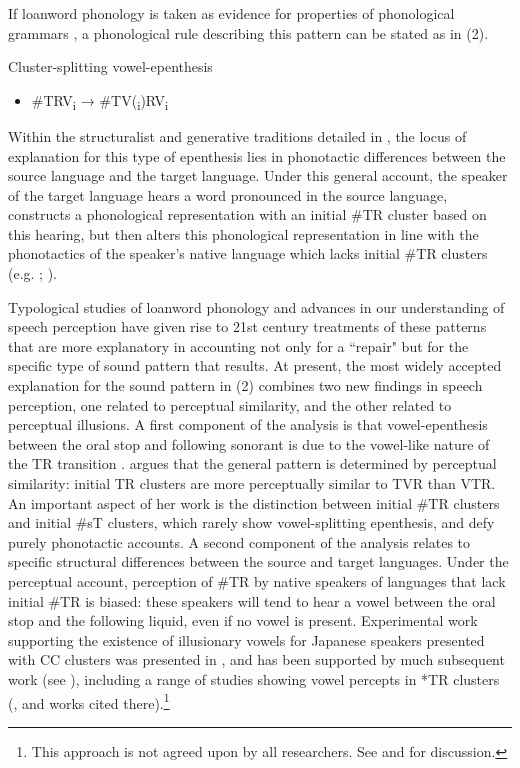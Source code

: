 \documentclass[output=paper,
modfonts
]{LSP/langsci}
\begin{document}
If loanword phonology is taken as evidence for properties of
phonological grammars \citep{hyman1970a}, a phonological rule describing this
pattern can be stated as in (2).

\ea Cluster-splitting vowel-epenthesis
	\begin{itemize}
	\item[] \#TRV\textsubscript{i} → \#TV(\textsubscript{i})RV\textsubscript{i}
	\end{itemize}
\z

Within the structuralist and generative traditions detailed in \citet{anderson1985a}, the locus of explanation for this type of epenthesis lies in
phonotactic differences between the source language and the target
language. Under this general account, the speaker of the target language
hears a word pronounced in the source language, constructs a
phonological representation with an initial \#TR cluster based on this
hearing, but then alters this phonological representation in line with
the phonotactics of the speaker's native language which lacks initial
\#TR clusters (e.g. \citealt{broselow1987a}; \citealt{ito1989a}).

Typological studies of loanword phonology and advances in our
understanding of speech perception have given rise to 21st century
treatments of these patterns that are more explanatory in accounting not
only for a ``repair" but for the specific type of sound pattern that
results. At present, the most widely accepted explanation for the sound
pattern in (2) combines two new findings in speech perception, one
related to perceptual similarity, and the other related to perceptual
illusions. A first component of the analysis is that vowel-epenthesis
between the oral stop and following sonorant is due to the vowel-like
nature of the TR transition \citep{fleischhacker2001a, fleischhacker2005a,Kang2011, berent2013a, broselow2015a}. \citet{fleischhacker2001a, fleischhacker2005a} argues that the general
pattern is determined by perceptual similarity: initial TR clusters are
more perceptually similar to TVR than VTR. An important aspect of her
work is the distinction between initial \#TR clusters and initial \#sT
clusters, which rarely show vowel-splitting epenthesis, and defy purely
phonotactic accounts. A second component of the analysis relates to
specific structural differences between the source and target languages.
Under the perceptual account, perception of \#TR by native speakers of
languages that lack initial \#TR is biased: these speakers will tend to
hear a vowel between the oral stop and the following liquid, even if no
vowel is present. Experimental work supporting the existence of
illusionary vowels for Japanese speakers presented with CC clusters was
presented in \citet{dupoux1999a}, and has been supported by much
subsequent work (see \citealt{peperkamp2002a,kang2003a,Kang2011,kabak2007a,davidson2012a}), including a range of studies
showing vowel percepts in *TR clusters (\citealt{berent2013a}, and works cited
there).\footnote{This approach is not agreed upon by all researchers.
  See \citet{uffmann2007a} and \citet{hall2011a} for discussion.}
\end{document}
